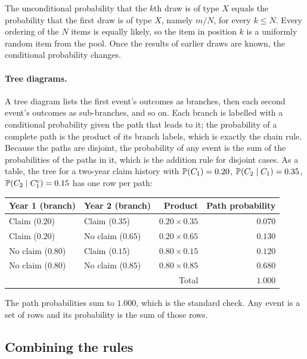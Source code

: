 \begin{keyfact}
The unconditional probability that the $k$th draw is of type $X$ equals the probability that the
first draw is of type $X$, namely $m/N$, for every $k \le N$. Every ordering of the $N$ items is
equally likely, so the item in position $k$ is a uniformly random item from the pool. Once the
results of earlier draws are known, the conditional probability changes.
\end{keyfact}

\paragraph{Tree diagrams.} A tree diagram lists the first event's outcomes as branches, then each
second event's outcomes as sub-branches, and so on. Each branch is labelled with a conditional
probability given the path that leads to it; the probability of a complete path is the product of
its branch labels, which is exactly the chain rule. Because the paths are disjoint, the probability
of any event is the sum of the probabilities of the paths in it, which is the addition rule for
disjoint cases. As a table, the tree for a two-year claim history with
$\mathbb{P}(C_1) = 0.20$, $\mathbb{P}(C_2 \mid C_1) = 0.35$, $\mathbb{P}(C_2 \mid C_1^{\mathrm{c}}) = 0.15$ has one row per path:

\begin{center}
\begin{tabular}{@{}llrr@{}}
\toprule
Year 1 (branch) & Year 2 (branch) & Product & Path probability \\
\midrule
Claim ($0.20$)    & Claim ($0.35$)    & $0.20 \times 0.35$ & $0.070$ \\
Claim ($0.20$)    & No claim ($0.65$) & $0.20 \times 0.65$ & $0.130$ \\
No claim ($0.80$) & Claim ($0.15$)    & $0.80 \times 0.15$ & $0.120$ \\
No claim ($0.80$) & No claim ($0.85$) & $0.80 \times 0.85$ & $0.680$ \\
\midrule
 & & Total & $1.000$ \\
\bottomrule
\end{tabular}
\end{center}

The path probabilities sum to $1.000$, which is the standard check. Any event is a set of rows and
its probability is the sum of those rows.

\subsection{Combining the rules}

